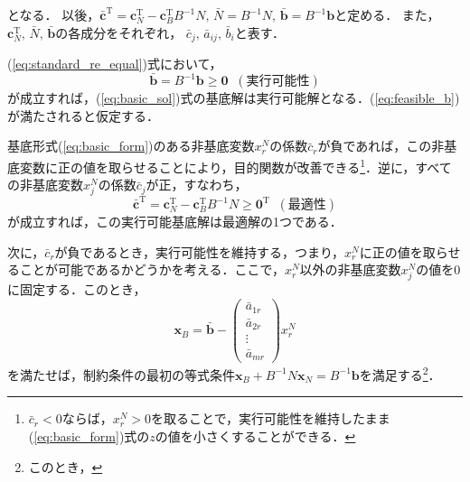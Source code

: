 \documentclass{jsreport}
\begin{document}
となる．
以後，$\bar{\bm{c}}^{\mathrm{T}} = \bm{c}_N^{\mathrm{T}} - \bm{c}_B^{\mathrm{T}}B^{-1}N, \, \bar{N} = B^{-1}N, \, \bar{\bm{b}} = B^{-1}\bm{b}$と定める．
また，$\bm{c}_N^{\mathrm{T}}, \, \bar{N}, \, \bar{\bm{b}}$の各成分をそれぞれ，
$\bar{c}_{j}, \, \bar{a}_{ij}, \, \bar{b}_i$と表す．

(\ref{eq:standard_re_equal})式において，
\begin{equation}\label{eq:feasible_b}
  \bar{\bm{b}} = B^{-1}\bm{b} \geq \bm{0} \; \; (実行可能性)
\end{equation}
が成立すれば，(\ref{eq:basic_sol})式の基底解は実行可能解となる．(\ref{eq:feasible_b})が満たされると仮定する．

基底形式(\ref{eq:basic_form})のある非基底変数$x_r^N$の係数$\bar{c}_r$が負であれば，この非基底変数に正の値を取らせることにより，目的関数が改善できる\footnote{$\bar{c}_r < 0$ならば，$x_r^N > 0$を取ることで，実行可能性を維持したまま(\ref{eq:basic_form})式の$z$の値を小さくすることができる．}．逆に，すべての非基底変数$x_j^N$の係数$\bar{c}_j$が正，すなわち，
\begin{equation}\label{eq:opt_con}
  \bar{\bm{c}}^{\mathrm{T}} = \bm{c}_N^{\mathrm{T}} - \bm{c}_B^{\mathrm{T}}B^{-1}N \geq \bm{0}^{\mathrm{T}} \; \; (最適性)
\end{equation}
が成立すれば，この実行可能基底解は最適解の1つである．

次に，$\bar{c}_r$が負であるとき，実行可能性を維持する，つまり，$x_r^N$に正の値を取らせることが可能であるかどうかを考える．ここで，$x_r^N$以外の非基底変数$x_j^N$の値を0に固定する．このとき，
\begin{equation}
  \bm{x}_B = \bar{\bm{b}} -
  \left(
  \begin{array}{c}
    \bar{a}_{1r} \\
    \bar{a}_{2r} \\
    \vdots \\
    \bar{a}_{mr}
  \end{array}
  \right)x_r^N
\end{equation}
を満たせば，制約条件の最初の等式条件$\bm{x}_B + B^{-1}N\bm{x}_N = B^{-1}\bm{b}$を満足する\footnote{
このとき，
}．
\end{document}
